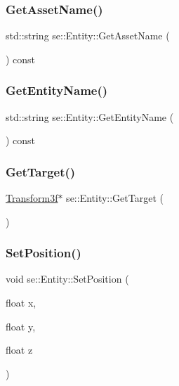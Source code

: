 \subsubsection{\texorpdfstring{Get\+Asset\+Name()}{GetAssetName()}}
{\footnotesize\ttfamily std\+::string se\+::\+Entity\+::\+Get\+Asset\+Name (\begin{DoxyParamCaption}{ }\end{DoxyParamCaption}) const}

\mbox{\label{classse_1_1_entity_a2de55d070d6de1404c69e0da8b9d6d50}} 
\subsubsection{\texorpdfstring{Get\+Entity\+Name()}{GetEntityName()}}
{\footnotesize\ttfamily std\+::string se\+::\+Entity\+::\+Get\+Entity\+Name (\begin{DoxyParamCaption}{ }\end{DoxyParamCaption}) const}

\mbox{\label{classse_1_1_entity_a677f32cd82e63f814b4be91518263242}} 
\subsubsection{\texorpdfstring{Get\+Target()}{GetTarget()}}
{\footnotesize\ttfamily \mbox{\hyperlink{classse_1_1_transform3f}{Transform3f}}$\ast$ se\+::\+Entity\+::\+Get\+Target (\begin{DoxyParamCaption}{ }\end{DoxyParamCaption})}

\mbox{\label{classse_1_1_entity_a09e198e70620f231106d9f375f7598f3}} 
\subsubsection{\texorpdfstring{Set\+Position()}{SetPosition()}}
{\footnotesize\ttfamily void se\+::\+Entity\+::\+Set\+Position (\begin{DoxyParamCaption}\item[{float}]{x,  }\item[{float}]{y,  }\item[{float}]{z }\end{DoxyParamCaption})}

